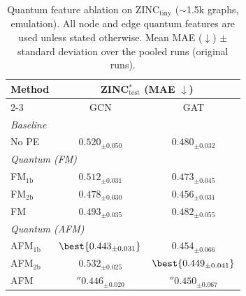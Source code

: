 \begin{table}
\caption{Quantum feature ablation on ZINC$_{\text{tiny}}$ ($\sim$1.5k graphs, emulation). All node and edge quantum features are used unless stated otherwise. Mean MAE ($\downarrow$) $\pm$ standard deviation over the pooled runs (original runs).}
\label{tab:ablation-zinc-tiny}
\centering
\begin{tabular}{l c c}
\toprule
\multirow{2}{*}{Method} & \multicolumn{2}{c}{ZINC$^{*}_{\text{test}}$ (MAE $\downarrow$)} \\
\cmidrule(lr){2-3}
 & GCN & GAT \\
\midrule
\multicolumn{3}{l}{\textit{Baseline}} \\
  No PE & $0.520{_{\pm 0.050}}$ & $0.480{_{\pm 0.032}}$ \\
\midrule
\multicolumn{3}{l}{\textit{Quantum (FM)}} \\
  FM$_{1\text{b}}$ & $0.512{_{\pm 0.031}}$ & $0.473{_{\pm 0.045}}$ \\
  FM$_{2\text{b}}$ & $0.478{_{\pm 0.030}}$ & $0.456{_{\pm 0.031}}$ \\
  FM & $0.493{_{\pm 0.035}}$ & $0.482{_{\pm 0.055}}$ \\
\midrule
\multicolumn{3}{l}{\textit{Quantum (AFM)}} \\
  AFM$_{1\text{b}}$ & $\best{0.443{_{\pm 0.031}}}$ & $0.454{_{\pm 0.066}}$ \\
  AFM$_{2\text{b}}$ & $0.532{_{\pm 0.025}}$ & $\best{0.449{_{\pm 0.041}}}$ \\
  AFM & $\second{0.446}{_{\pm 0.020}}$ & $\second{0.450}{_{\pm 0.067}}$ \\
\bottomrule
\end{tabular}
\end{table}
